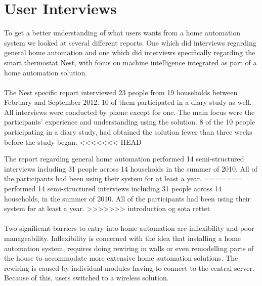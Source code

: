 \section{User Interviews}
\label{sec:interviewReports}
To get a better understanding of what users wants from a home automation system we looked at several different reports. One which did interviews regarding general home automation\cite{HAInterviews} and one which did interviews specifically regarding the smart thermostat Nest, with focus on machine intelligence integrated as part of a home automation solution\cite{AdaptiveInterviews}. 
\\\\
The Nest specific report interviewed 23 people from 19 households between February and September 2012. 10 of them participated in a diary study as well. All interviews were conducted by phone except for one. The main focus were the participants' experience and understanding using the solution. 8 of the 10 people participating in a diary study, had obtained the solution fewer than three weeks before the study began\cite{AdaptiveInterviews}. 
<<<<<<< HEAD

The report regarding general home automation performed 14 semi-structured interviews including 31 people across 14 households in the summer of 2010. All of the participants had been using their system for at least a year\cite{HAInterviews}.
=======
\cite{HAInterviews} performed 14 semi-structured interviews including 31 people across 14 households, in the summer of 2010. All of the participants had been using their system for at least a year.
>>>>>>> introduction og sota rettet
\\\\
Two significant barriers to entry into home automation are inflexibility and poor manageability\cite{HAInterviews}. Inflexibility is concerned with the idea that installing a home automation system, requires doing rewiring in walls or even remodelling parts of the house to accommodate more extensive home automation solutions. The rewiring is caused by individual modules having to connect to the central server. Because of this, users switched to a wireless solution\cite{HAInterviews}.

